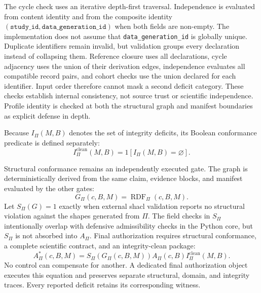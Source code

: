 
The cycle check uses an iterative depth-first traversal. Independence is evaluated from content identity and from the composite identity $(\texttt{study\_id},\texttt{data\_generation\_id})$ when both fields are non-empty. The implementation does not assume that \texttt{data\_generation\_id} is globally unique. Duplicate identifiers remain invalid, but validation groups every declaration instead of collapsing them. Reference closure uses all declarations, cycle adjacency uses the union of their derivation edges, independence evaluates all compatible record pairs, and cohort checks use the union declared for each identifier. Input order therefore cannot mask a second deficit category. These checks establish internal consistency, not source trust or scientific independence. Profile identity is checked at both the structural graph and manifest boundaries as explicit defense in depth.

Because $I_{\Pi}(M,B)$ denotes the set of integrity deficits, its Boolean conformance predicate is defined separately:
\begin{equation}
I^{\mathrm{clean}}_{\Pi}(M,B)=\mathrm{1}[I_{\Pi}(M,B)=\varnothing].
\label{eq:integrity-clean}
\end{equation}

Structural conformance remains an independently executed gate. The graph is deterministically derived from the same claim, evidence blocks, and manifest evaluated by the other gates:
\begin{equation}
G_{\Pi}(c,B,M)=\operatorname{RDF}_{\Pi}(c,B,M).
\label{eq:package-rdf}
\end{equation}
Let $S_{\Pi}(G)=1$ exactly when external \ac{shacl} validation reports no structural violation against the shapes generated from $\Pi$. The field checks in $S_{\Pi}$ intentionally overlap with defensive admissibility checks in the Python core, but $S_{\Pi}$ is not absorbed into $A_{\Pi}$. Final authorization requires structural conformance, a complete scientific contract, and an integrity-clean package:
\begin{equation}
A^{*}_{\Pi}(c,B,M)=S_{\Pi}(G_{\Pi}(c,B,M))A_{\Pi}(c,B)
I^{\mathrm{clean}}_{\Pi}(M,B).
\label{eq:integrity-authorization}
\end{equation}
No control can compensate for another. A dedicated final authorization object executes this equation and preserves separate structural, domain, and integrity traces. Every reported deficit retains its corresponding witness.

